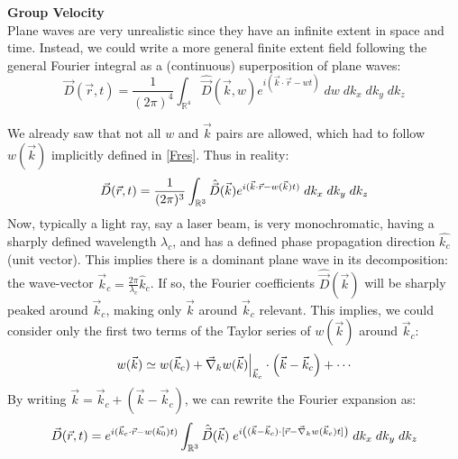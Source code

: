 \documentclass[11pt, a4paper, twoside]{article} %
\newcommand{\R}{\mathbb{R}} %
\DeclareRobustCommand{\mybox}[2][gray!10]{%
\begin{tcolorbox}[   %
        left=0.2cm,
        right=0.2cm,
        top=0.15cm,
        bottom=0.15cm,
        colback=#1,
        colframe=#1,
        width=\dimexpr\textwidth\relax, 
        enlarge left by=0mm,
        boxsep=5pt,
        arc=0pt,outer arc=0pt,
        ]
        #2
\end{tcolorbox}
}
\begin{document}
\mybox{{\bf Group Velocity\vspace{0.2cm}}\\
Plane waves are very unrealistic since they have an infinite extent in space and time. Instead, we could write a more general finite extent field following the general Fourier integral as a (continuous) superposition of plane waves:\vspace{-0.2cm}
\begin{equation}
\vec{D}(\vec{r},t)= \frac{1}{(2\pi)^4}\int_{\R^4}\hat{\vec{D}}(\vec{k},w)e^{i(\vec{k}\cdot\vec{r}-wt)}\; dw\;dk_x\;dk_y\;dk_z
\end{equation}}
\mybox{
We already saw that not all $w$ and $\vec{k}$ pairs are allowed, which had to follow $w(\vec{k})$ implicitly defined in \eqref{Fres}. Thus in reality:\vspace{-0.2cm}
\begin{equation}
\vec{D}(\vec{r},t)= \frac{1}{(2\pi)^3}\int_{\R^3}\hat{\vec{D}}(\vec{k})e^{i(\vec{k}\cdot\vec{r}-w(\vec{k})t)} \;dk_x\;dk_y\;dk_z\vspace{-0.2cm}
\end{equation}
Now, typically a light ray, say a laser beam, is very monochromatic, having a sharply defined wavelength $\lambda_c$, and has a defined phase propagation direction $\hat{k_c}$ (unit vector). This implies there is a dominant plane wave in its decomposition: the wave-vector $\vec{k}_c=\frac{2\pi}{\lambda_c}\hat{k}_c$. If so, the Fourier coefficients $\hat{\vec{D}}(\vec{k})$ will be sharply peaked around $\vec{k}_c$, making only $\vec{k}$ around $\vec{k}_c$ relevant. This implies, we could consider only the first two terms of the Taylor series of $w(\vec{k})$ around $\vec{k}_c$:\vspace{-0.2cm}
\begin{equation}
w(\vec{k})\simeq w(\vec{k}_c)+\vec{\nabla}_kw(\vec{k})\Big\rvert_{\vec{k}_c}\cdot\qty(\vec{k}-\vec{k}_c)+\cdots\vspace{-0.2cm}
\end{equation}
By writing $\vec{k}=\vec{k}_c+(\vec{k}-\vec{k}_c)$, we can rewrite the Fourier expansion as:\vspace{-0.1cm}
\begin{equation}
\vec{D}(\vec{r},t)=e^{i(\vec{k}_c\cdot\vec{r}-w(\vec{k_0})t)}\int_{\R^3}\hat{\vec{D}}(\vec{k})\;e^{i\qty((\vec{k}-\vec{k}_c)\cdot [\vec{r}-\vec{\nabla}_kw(\vec{k}_c)t])}\;dk_x\;dk_y\;dk_z\vspace{-0.2cm}
\end{equation}
}
\end{document}
